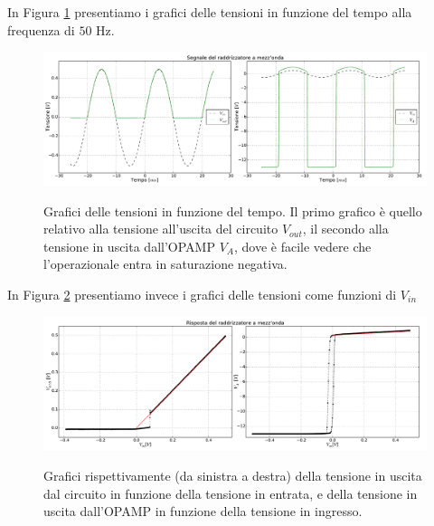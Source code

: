 In Figura \ref{gr5:primo_raddrizzatore} presentiamo i grafici delle tensioni in funzione del tempo alla frequenza di $50$ \si{\hertz}.

\begin{figure}[H]
 \centering
   {\includegraphics[width=16.5cm]{../E05/latex/unite_tempo.pdf}}
 \caption{Grafici delle tensioni in funzione del tempo. Il primo grafico è quello relativo alla tensione all'uscita del circuito $V_{out}$, il secondo alla tensione in uscita dall'OPAMP $V_A$, dove è facile vedere che l'operazionale entra in saturazione negativa.}
 \label{gr5:primo_raddrizzatore}
\end{figure}

In Figura \ref{gr5:primo_raddrizzatore_vin} presentiamo invece i grafici delle tensioni come funzioni di $V_{in}$

\begin{figure}[H]
 \centering
   {\includegraphics[width=16.5cm]{../E05/latex/u_risposta.pdf}}
 \caption{Grafici rispettivamente (da sinistra a destra) della tensione in uscita dal circuito in funzione della tensione in entrata, e della tensione in uscita dall'OPAMP in funzione della tensione in ingresso.}
 \label{gr5:primo_raddrizzatore_vin}
\end{figure}


